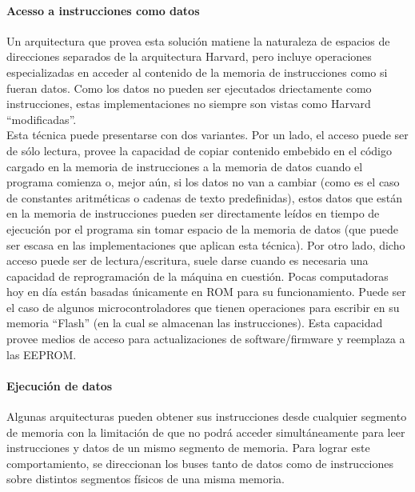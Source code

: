 \paragraph{Acesso a instrucciones como datos}
\label{par:theory-modern-memory_access-modified_harvard-instructions_as_data}

Un arquitectura que provea esta solución matiene la naturaleza de espacios de
direcciones separados de la arquitectura Harvard, pero incluye operaciones
especializadas en acceder al contenido de la memoria de instrucciones como si
fueran datos. Como los datos no pueden ser ejecutados driectamente como
instrucciones, estas implementaciones no siempre son vistas como Harvard
``modificadas''.\\
Esta técnica puede presentarse con dos variantes. Por un lado, el acceso puede
ser de sólo lectura, provee la capacidad de copiar contenido embebido en el
código cargado en la memoria de instrucciones a la memoria de datos cuando el
programa comienza o, mejor aún, si los datos no van a cambiar (como es el caso
de constantes aritméticas o cadenas de texto predefinidas), estos datos que
están en la memoria de instrucciones pueden ser directamente leídos en tiempo de
ejecución por el programa sin tomar espacio de la memoria de datos (que puede
ser escasa en las implementaciones que aplican esta técnica). Por otro lado,
dicho acceso puede ser de lectura/escritura, suele darse cuando es necesaria una
capacidad de reprogramación de la máquina en cuestión. Pocas computadoras hoy en
día están basadas únicamente en ROM para su funcionamiento. Puede ser el caso de
algunos microcontroladores que tienen operaciones para escribir en su memoria
``Flash'' (en la cual se almacenan las instrucciones). Esta capacidad provee
medios de acceso para actualizaciones de software/firmware y reemplaza a las
EEPROM.

\paragraph{Ejecución de datos}
\label{par:theory-modern-memory_access-modified_harvard-data_execution}

Algunas arquitecturas pueden obtener sus instrucciones desde cualquier segmento
de memoria con la limitación de que no podrá acceder simultáneamente para leer
instrucciones y datos de un mismo segmento de memoria. Para lograr este
comportamiento, se direccionan los buses tanto de datos como de instrucciones
sobre distintos segmentos físicos de una misma memoria.

